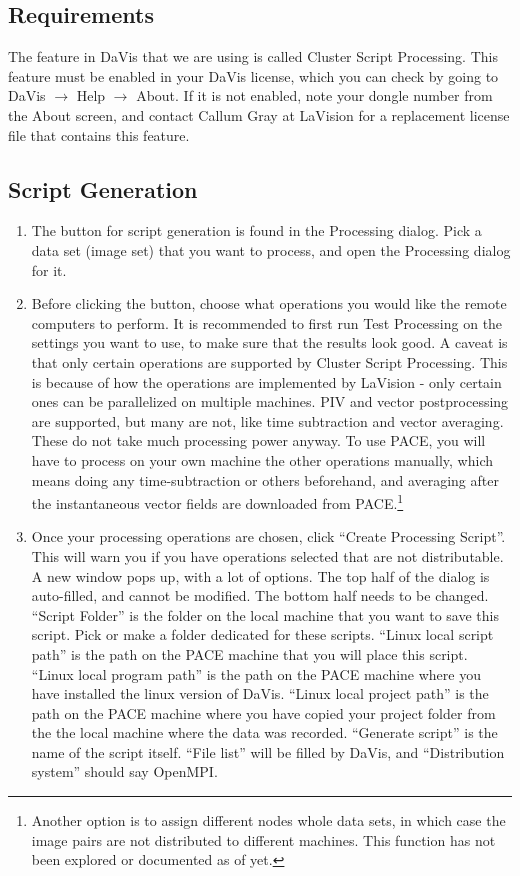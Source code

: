 \documentclass{article}
\newcommand{\quotes}[1]{``#1''}
\begin{document}
	\subsection{Requirements}
	The feature in DaVis that we are using is called Cluster Script Processing.  This feature must be enabled in your DaVis license, which you can check by going to DaVis $\rightarrow$ Help $\rightarrow$ About.  If it is not enabled, note your dongle number from the About screen, and contact Callum Gray at LaVision for a replacement license file that contains this feature.
	
	\subsection{Script Generation}
	
	\begin{enumerate}
			\item 	The button for script generation is found in the Processing dialog.  Pick a data set (image set) that you want to process, and open the Processing dialog for it. 
			
			\item 	Before clicking the button, choose what operations you would like the remote computers to perform.  It is recommended to first run Test Processing on the settings you want to use, to make sure that the results look good.  A caveat is that only certain operations are supported by Cluster Script Processing.  This is because of how the operations are implemented by LaVision - only certain ones can be parallelized on multiple machines.  PIV and vector postprocessing are supported, but many are not, like time subtraction and vector averaging.  These do not take much processing power anyway.  To use PACE, you will have to process on your own machine the other operations manually, which means doing any time-subtraction or others beforehand, and averaging after the instantaneous vector fields are downloaded from PACE.\footnote{Another option is to assign different nodes whole data sets, in which case the image pairs are not distributed to different machines.  This function has not been explored or documented as of yet.}
			
			\item	Once your processing operations are chosen, click \quotes{Create Processing Script}.  This will warn you if you have operations selected that are not distributable.  A new window pops up, with a lot of options.  The top half of the dialog is auto-filled, and cannot be modified.  The bottom half needs to be changed.  \quotes{Script Folder} is the folder on the local machine that you want to save this script.  Pick or make a folder dedicated for these scripts.  \quotes{Linux local script path} is the path on the PACE machine that you will place this script.  \quotes{Linux local program path} is the path on the PACE machine where you have installed the linux version of DaVis.  \quotes{Linux local project path} is the path on the PACE machine where you have copied your project folder from the the local machine where the data was recorded.  \quotes{Generate script} is the name of the script itself.  \quotes{File list} will be filled by DaVis, and \quotes{Distribution system} should say OpenMPI.
			

\end{enumerate}
\end{document}
